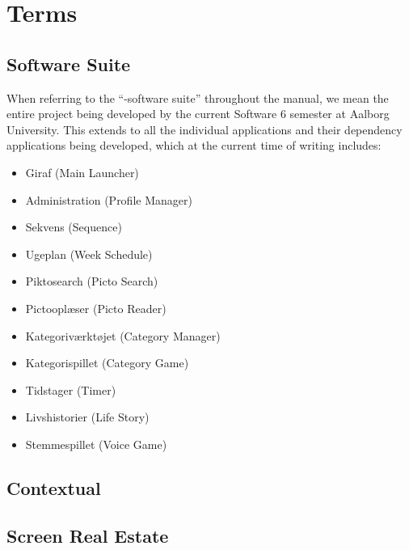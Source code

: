 
\chapter{Terms}

\section{\giraf Software Suite}
\noindent When referring to the ``\giraf-software suite'' throughout the manual, we mean the entire \giraf project being developed by the current Software 6 semester at Aalborg University. This extends to all the individual applications and their dependency applications being developed, which at the current time of writing includes: 

\begin{itemize}
    \item Giraf (Main Launcher)
    \item Administration (Profile Manager)
    \item Sekvens (Sequence)
    \item Ugeplan (Week Schedule)
    \item Piktosearch (Picto Search)
    \item Pictooplæser (Picto Reader)
    \item Kategoriværktøjet (Category Manager)
    \item Kategorispillet (Category Game)
    \item Tidstager (Timer)
    \item Livshistorier (Life Story)
    \item Stemmespillet (Voice Game)
\end{itemize}

\section{Contextual}


\section{Screen Real Estate}
